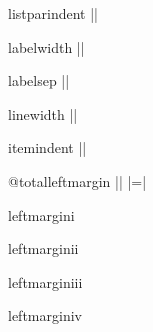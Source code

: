 \begin{docCommand}{listparindent} {}
|\newdimen\listparindent|
\end{docCommand}

\begin{docCommand}{labelwidth} {}
|\newdimen{}|
\end{docCommand}


\begin{docCommand}{labelsep} {}
 |\newdimen{}|
\end{docCommand}

\begin{docCommand}{linewidth} {}
|\newdimen\linewidth|
\end{docCommand}

\begin{docCommand}{itemindent} {}
|\newdimen\itemindent|
\end{docCommand}

\begin{docCommand}{@totalleftmargin} {}
|\newdimen\@totalleftmargin|  |\@totalleftmargin=\z@|
\end{docCommand}


 
\begin{docCommand} {leftmargini} { }
\end{docCommand}
\begin{teX}
\newdimen\leftmargini
\end{teX}
\begin{docCommand} {leftmarginii} { }
\end{docCommand}
\begin{teX}
\newdimen\leftmarginii
\end{teX}

\begin{docCommand} {leftmarginiii} { }
\end{docCommand}
\begin{teX}
\newdimen\leftmarginiii
\end{teX}

\begin{docCommand} {leftmarginiv} { }
\end{docCommand}
\begin{teX}
\newdimen\leftmarginiv
\end{teX}
    \begin{teX}
\newdimen\leftmarginv
    \end{teX}


